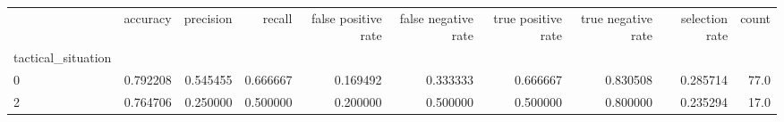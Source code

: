 \begin{tabular}{lrrrrrrrrr}
\toprule
{} &  accuracy &  precision &    recall &  false positive rate &  false negative rate &  true positive rate &  true negative rate &  selection rate &  count \\
tactical\_situation &           &            &           &                      &                      &                     &                     &                 &        \\
\midrule
0                  &  0.792208 &   0.545455 &  0.666667 &             0.169492 &             0.333333 &            0.666667 &            0.830508 &        0.285714 &   77.0 \\
2                  &  0.764706 &   0.250000 &  0.500000 &             0.200000 &             0.500000 &            0.500000 &            0.800000 &        0.235294 &   17.0 \\
\bottomrule
\end{tabular}
